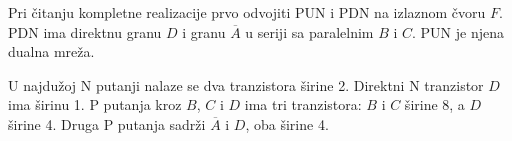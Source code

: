 Pri čitanju kompletne realizacije prvo odvojiti PUN i PDN na izlaznom čvoru $F$. PDN ima direktnu granu $D$ i granu $\overline A$ u seriji sa paralelnim $B$ i $C$. PUN je njena dualna mreža.

U najdužoj N putanji nalaze se dva tranzistora širine 2. Direktni N tranzistor $D$ ima širinu 1. P putanja kroz $B$, $C$ i $D$ ima tri tranzistora: $B$ i $C$ širine 8, a $D$ širine 4. Druga P putanja sadrži $\overline A$ i $D$, oba širine 4.
